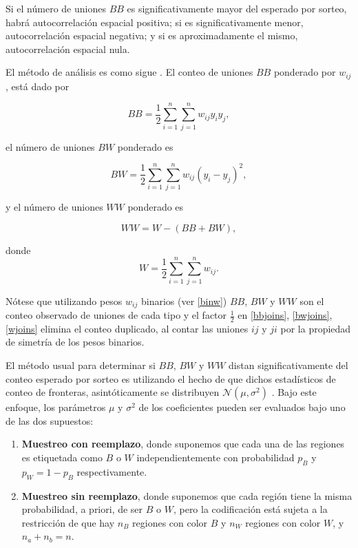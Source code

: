 Si el número de uniones $BB$ es significativamente mayor del esperado por sorteo, habrá autocorrelación espacial positiva;  si es significativamente menor, autocorrelación espacial negativa; y si es aproximadamente el mismo, autocorrelación espacial nula.

El método de análisis es como sigue \citep{moran48}. El conteo de uniones $BB$ ponderado por $w_{ij}$, está dado por

\begin{equation} \label{bbjoins}
BB = \dfrac{1}{2} \sum_{i=1}^n\sum_{j=1}^n w_{ij} y_i y_j ,
\end{equation}

el número de uniones $BW$ ponderado es

\begin{equation} \label{bwjoins}
BW = \dfrac{1}{2} \sum_{i=1}^n\sum_{j=1}^n w_{ij} (y_i - y_j)^2,
\end{equation}

y el número de uniones $WW$ ponderado es

\begin{equation}
WW = W-(BB+BW),
\end{equation}

donde
\begin{equation} \label{wjoins}
 W = \dfrac{1}{2} \sum_{i=1}^n\sum_{j=1}^n w_{ij} .
\end{equation}

Nótese que utilizando pesos $w_{ij}$ binarios (ver \eqref{binw}) $BB$, $BW$ y $WW$ son el conteo observado de uniones de cada tipo y el factor $\frac{1}{2}$ en \eqref{bbjoins}, \eqref{bwjoins}, \eqref{wjoins} elimina el conteo duplicado, al contar las uniones $ij$ y $ji$ por la propiedad de simetría de los pesos binarios.


El método usual para determinar si $BB$, $BW$ y $WW$ distan significativamente del conteo esperado por sorteo es utilizando el hecho de que dichos estadísticos de conteo de fronteras, asintóticamente se distribuyen $\mathcal{N}(\mu, \sigma^2)$ \citep[Capítulo 2]{clifford1973}. Bajo este enfoque, los parámetros $\mu$ y $\sigma^2$ de los coeficientes pueden ser evaluados bajo uno de las dos supuestos:

\begin{enumerate}
\item \textbf{Muestreo con reemplazo}, donde suponemos que cada una de las regiones es etiquetada como $B$ o $W$ independientemente con probabilidad $p_B$ y $p_W=1-p_B$ respectivamente. 

\item \textbf{Muestreo sin reemplazo}, donde suponemos que cada región tiene la misma probabilidad, a priori, de ser $B$ o $W$, pero la codificación está sujeta a la restricción de que hay $n_B$ regiones con color $B$ y $n_W$ regiones con color $W$, y $n_a+n_b=n$.
\end{enumerate}

